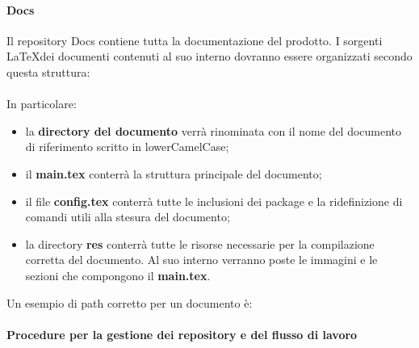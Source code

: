 \paragraph{Docs}
Il repository Docs contiene tutta la documentazione del prodotto. I sorgenti \LaTeX \space dei documenti contenuti al suo interno dovranno essere organizzati secondo questa struttura:\\\\

\vspace{1cm}
\noindent In particolare: 
\begin{itemize}
	\item la \textbf{directory del documento} verrà rinominata con il nome del documento di riferimento scritto in lowerCamelCase;
	\item il \textbf{main.tex} conterrà la struttura principale del documento;
	\item il file \textbf{config.tex} conterrà tutte le inclusioni dei package e la ridefinizione di comandi utili alla stesura del documento;
	\item la directory \textbf{res} conterrà tutte le risorse necessarie per la compilazione corretta del documento. Al suo interno verranno poste le immagini e le sezioni che compongono il \textbf{main.tex}.
\end{itemize}
Un esempio di path corretto per un documento è:\\ 

\centerline{}
\vspace{0.7cm}


\paragraph{Procedure per la gestione dei repository e del flusso di lavoro}
	
